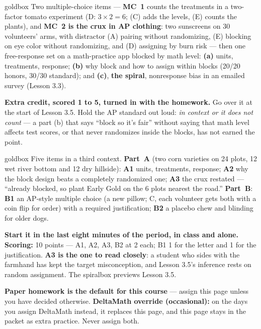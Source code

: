 \documentclass[10pt]{article}
\begin{document}
\boxguard
\begin{skillbox}{goldbox}
Two multiple-choice items --- \textbf{MC~1} counts the treatments in a two-factor tomato
experiment (D: $3 \times 2 = 6$; (C) adds the levels, (E) counts the plants), and
\textbf{MC~2 is the crux in AP clothing}: two sunscreens on 30 volunteers' arms, with
distractor (A) pairing without randomizing, (E) blocking on eye color without randomizing,
and (D) assigning by burn risk --- then one free-response set on a math-practice app blocked by
math level: \textbf{(a)} units, treatments, response; \textbf{(b)} why block and how to assign
within blocks (20/20 honors, 30/30 standard); and \textbf{(c)}, \textbf{the spiral},
nonresponse bias in an emailed survey (Lesson 3.3).

\textbf{Extra credit, scored 1 to 5, turned in with the homework.} Go over it at
the start of Lesson 3.5. Hold the AP standard out loud: \emph{in context or it does not count}
--- a part (b) that says ``block so it's fair'' without saying that math level affects test
scores, or that never randomizes inside the blocks, has not earned the point.
\end{skillbox}

\boxguard
\begin{skillbox}{goldbox}
Five items in a third context. \textbf{Part~A} (two corn varieties on 24 plots, 12 wet river
bottom and 12 dry hillside): \textbf{A1} units, treatments, response; \textbf{A2} why the
block design beats a completely randomized one; \textbf{A3} the crux restated --- ``already
blocked, so plant Early Gold on the 6 plots nearest the road.'' \textbf{Part~B}: \textbf{B1}
an AP-style multiple choice (a new pillow; C, each volunteer gets both with a coin flip for
order) with a required justification; \textbf{B2} a placebo chew and blinding for older dogs.

\textbf{Start it in the last eight minutes of the period, in class and alone.}
\textbf{Scoring:} 10 points --- A1, A2, A3, B2 at 2 each; B1 1 for the letter and 1 for the
justification. \textbf{A3 is the one to read closely}: a student who sides with the farmhand
has kept the target misconception, and Lesson 3.5's inference rests on random assignment.
The spiralbox previews Lesson 3.5.

\textbf{Paper homework is the default for this course} --- assign this page unless you have
decided otherwise. \textbf{DeltaMath override (occasional):} on the days you assign DeltaMath
instead, it replaces this page, and this page
stays in the packet as extra practice. Never assign both.
\end{skillbox}
\end{document}
